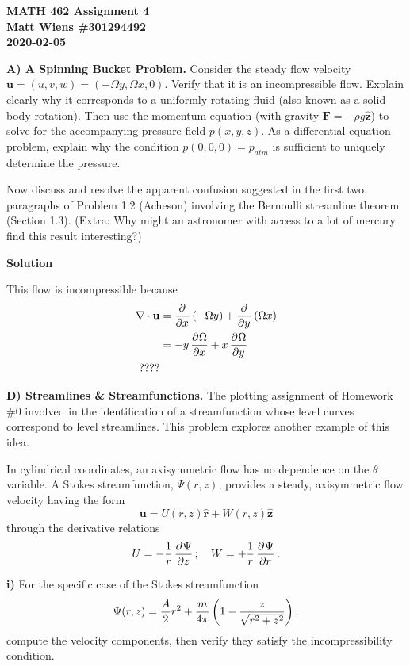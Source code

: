 \documentclass{article}
\def\*#1{\mathbf{#1}}
\newcommand{\rhat}{\mathbf{\hat{r}}}
\newcommand{\zhat}{\mathbf{\hat{z}}}
\begin{document}
\textbf{MATH 462 Assignment 4} \\
\textbf{Matt Wiens \#301294492} \\
\textbf{2020-02-05}

\textbf{A) A Spinning Bucket Problem.}
Consider the steady flow velocity $\*u = (u, v, w) = (-\Omega y, \Omega x,
0)$. Verify that it is an incompressible flow. Explain clearly why it
corresponds to a uniformly rotating fluid (also known as a solid body
rotation). Then use the momentum equation (with gravity $\*F = - \rho g
\zhat$) to solve for the accompanying pressure field $p(x, y, z)$. As a
differential equation problem, explain why the condition $p(0, 0,
0) = p_{atm}$ is sufficient to uniquely determine the pressure.

Now discuss and resolve the apparent confusion suggested in the first
two paragraphs of Problem 1.2 (Acheson) involving the Bernoulli
streamline theorem (Section 1.3). (Extra: Why might an astronomer with
access to a lot of mercury find this result interesting?)

\textbf{Solution}

This flow is incompressible because
%
\begin{align*}
    \nabla \cdot \*u
        &= \dpd{}{x} \del{-\Omega y} + \dpd{}{y} \del{\Omega x} \\
        &= - y \dpd{\Omega}{x} + x \dpd{\Omega}{y} \\
        ????
\end{align*}

\newpage

\textbf{D) Streamlines \& Streamfunctions.}
The plotting assignment of Homework \#0 involved in the identification
of a streamfunction whose level curves correspond to level streamlines.
This problem explores another example of this idea.

In cylindrical coordinates, an axisymmetric flow has no dependence on
the $\theta$ variable. A Stokes streamfunction, $\Psi(r, z)$, provides a
steady, axisymmetric flow velocity having the form
%
\begin{equation*}
    \*u = U(r, z) \rhat + W(r, z) \zhat
\end{equation*}
%
through the derivative relations
%
\begin{equation*}
    U = - \frac{1}{r} \dpd{\Psi}{z}; \quad W = + \frac{1}{r} \dpd{\Psi}{r}
    .
\end{equation*}

\textbf{i)} For the specific case of the Stokes streamfunction
%
\begin{equation*}
    \Psi(r, z) = \frac{A}{2} r^2 + \frac{m}{4 \pi} \del{1 - \frac{z}{\sqrt{r^2 + z^2}}}
    ,
\end{equation*}
%
compute the velocity components, then verify they satisfy the
incompressibility condition.
\end{document}
